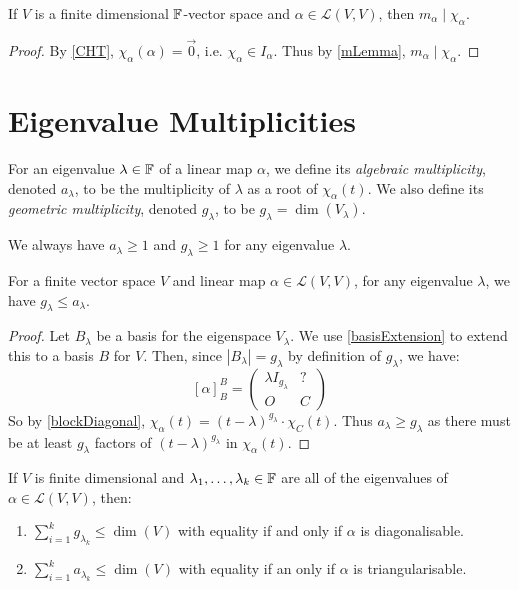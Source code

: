 \documentclass[../main.tex]{subfiles}
\begin{document}
\begin{corollary}
  If $V$ is a finite dimensional $\mathbb{F}$-vector space and $\alpha \in \mathcal{L}(V, V)$, then $m_{\alpha} \mid \chi_{\alpha}$. \label{mDivChi}
\end{corollary}
\begin{proof}
  By \cref{CHT}, $\chi_{\alpha}(\alpha) = \vec{0}$, i.e. $\chi_{\alpha} \in I_{\alpha}$.
  Thus by \cref{mLemma}, $m_{\alpha} \mid \chi_{\alpha}$.
\end{proof}
\section{Eigenvalue Multiplicities}
\begin{definition}
  For an eigenvalue $\lambda \in \mathbb{F}$ of a linear map $\alpha$, we define its \textit{algebraic multiplicity}, denoted $a_{\lambda}$, to be the multiplicity of $\lambda$ as a root of $\chi_{\alpha}(t)$.
  We also define its \textit{geometric multiplicity}, denoted $g_{\lambda}$, to be $g_{\lambda} = \dim(V_{\lambda})$.
\end{definition}
\begin{remark}
  We always have $a_{\lambda} \geq 1$ and $g_{\lambda} \geq 1$ for any eigenvalue $\lambda$.
\end{remark}
\begin{proposition}
  For a finite vector space $V$ and linear map $\alpha \in \mathcal{L}(V, V)$, for any eigenvalue $\lambda$, we have $g_{\lambda} \leq a_{\lambda}$. \label{AMGM}
\end{proposition}
\begin{proof}
  Let $B_{\lambda}$ be a basis for the eigenspace $V_{\lambda}$.
  We use \cref{basisExtension} to extend this to a basis $B$ for $V$.
  Then, since $|B_{\lambda}| = g_{\lambda}$ by definition of $g_{\lambda}$, we have:
  \[
    [\alpha]^{B}_{B} =  \left(\begin{array}{c|c}
      \lambda I_{g_{\lambda}} & ? \\ \hline
      O & C
    \end{array}\right)
  \]
  So by \cref{blockDiagonal}, $\chi_{\alpha}(t) = (t - \lambda)^{g_{\lambda}} \cdot \chi_{C}(t)$.
  Thus $a_{\lambda} \geq g_{\lambda}$ as there must be at least $g_{\lambda}$ factors of $(t - \lambda)^{g_{\lambda}}$ in $\chi_{\alpha}(t)$.
\end{proof}
\begin{lemma}
  If $V$ is finite dimensional and $\lambda_1, \ldots, \lambda_k \in \mathbb{F}$ are all of the eigenvalues of $\alpha \in \mathcal{L}(V, V)$, then: \label{eValueDT}
  \begin{enumerate}
    \item $\sum_{i = 1}^{k} g_{\lambda_k} \leq \dim(V)$ with equality if and only if $\alpha$ is diagonalisable.
    \item $\sum_{i = 1}^{k} a_{\lambda_k} \leq \dim(V)$ with equality if an only if $\alpha$ is triangularisable.
  \end{enumerate}
\end{lemma}
\end{document}
